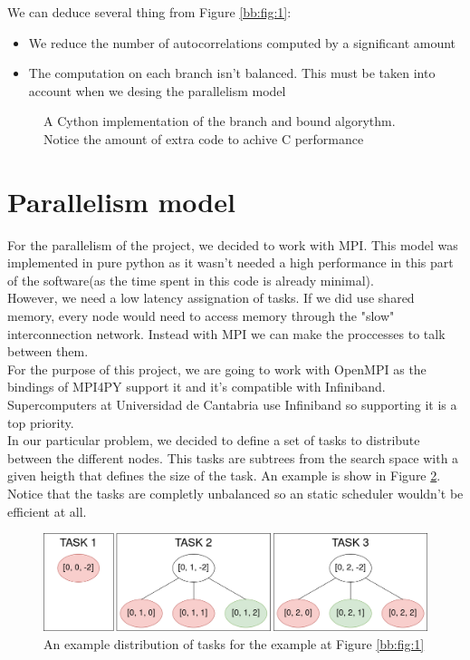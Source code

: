   We can deduce several thing from Figure \ref{bb:fig:1}:
  \begin{itemize}
    \item We reduce the number of autocorrelations computed by a significant amount
    \item The computation on each branch isn't balanced. This must be taken into
    account when we desing the parallelism model
  \end{itemize}

  \begin{figure}[ht!]
    \caption{A Cython implementation of the branch and bound algorythm. Notice
    the amount of extra code to achive C performance}
    \label{composite_auto:fig:1}
  \end{figure}


  \section{Parallelism model}

  For the parallelism of the project, we decided to work with MPI. This model
  was implemented in pure python as it wasn't needed a high performance in
  this part of the software(as the time spent in this code is already
  minimal).\\

  However, we need a low latency assignation of tasks. If we did use shared
  memory, every node would need to access memory through the "slow"
  interconnection network. Instead with MPI we can make the proccesses to
  talk between them.\\

  For the purpose of this project, we are going to work with OpenMPI
  as the bindings of MPI4PY support it and it's compatible with Infiniband.
  Supercomputers at Universidad de Cantabria use Infiniband so supporting it
  is a top priority.\\

  In our particular problem, we decided to define a set of tasks to
  distribute between the different nodes. This tasks are subtrees from the
  search space with a given heigth that defines the size of the task. An
  example is show in Figure \ref{tasks:fig:1}. Notice that the tasks are
  completly unbalanced so an static scheduler wouldn't be efficient at all.\\


  \begin{figure}[ht!]
    \begin{center}
      \includegraphics[scale=0.4]{Chapters/Implementation/Example_tasks.png}
    \end{center}
    \caption{An example distribution of tasks for the example at Figure
    \ref{bb:fig:1}}
    \label{tasks:fig:1}
  \end{figure}

